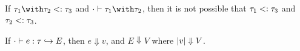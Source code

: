 \documentclass[a4paper]{article}
\begin{document}
\begin{lemma}
  If $\tau_1 \andOp \tau_2 \subtype \tau_3$ and
  $\cdot \turns \tau_1 \andOp \tau_2$, then it is not possible that
  $\tau_1 <: \tau_3$ and $\tau_2 <: \tau_3$.
\end{lemma}

\begin{lemma}
  If $ \cdot \vdash e : \tau \hookrightarrow E$, then $ e \Downarrow v $, and
  $E \Downarrow V$ where $\lvert v \rvert \Downarrow V$.
\end{lemma}
\end{document}
